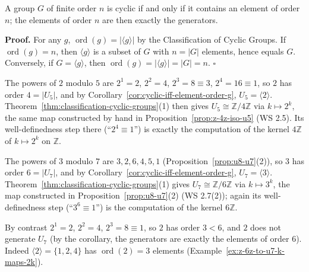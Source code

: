 \documentclass[11pt]{report}
\renewenvironment{proof}[1][Proof]{\noindent\textbf{#1.} }{\hfill$\square$\par\vspace{5pt}}
\begin{document}
\begin{corbox}\label{cor:cyclic-iff-element-order-g}
A group $G$ of finite order $n$ is cyclic if and only if it contains an element of order $n$; the elements of order $n$ are then exactly the generators.
\end{corbox}

\begin{proof}
For any $g$, $\operatorname{ord}(g) = |\langle g \rangle|$ by the Classification of Cyclic Groups. If $\operatorname{ord}(g) = n$, then $\langle g \rangle$ is a subset of $G$ with $n = |G|$ elements, hence equals $G$. Conversely, if $G = \langle g \rangle$, then $\operatorname{ord}(g) = |\langle g \rangle| = |G| = n$.
\end{proof}

\begin{exbox}\label{ex:u5-cyclic-instance-classification}
The powers of $2$ modulo $5$ are $2^1 = 2$, $2^2 = 4$, $2^3 = 8 \equiv 3$, $2^4 = 16 \equiv 1$, so $2$ has order $4 = |U_5|$, and by Corollary~\ref{cor:cyclic-iff-element-order-g}, $U_5 = \langle 2 \rangle$. Theorem~\ref{thm:classification-cyclic-groups}(1) then gives $U_5 \cong \mathbb{Z}/4\mathbb{Z}$ via $k \mapsto 2^k$, the same map constructed by hand in Proposition~\ref{prop:z-4z-iso-u5} (WS 2.5). Its well-definedness step there (``$2^4 \equiv 1$'') is exactly the computation of the kernel $4\mathbb{Z}$ of $k \mapsto 2^k$ on $\mathbb{Z}$.
\end{exbox}

\begin{exbox}\label{ex:u7-cyclic-generated-by-3}
The powers of $3$ modulo $7$ are $3, 2, 6, 4, 5, 1$ (Proposition~\ref{prop:u8-u7}(2)), so $3$ has order $6 = |U_7|$, and by Corollary~\ref{cor:cyclic-iff-element-order-g}, $U_7 = \langle 3 \rangle$. Theorem~\ref{thm:classification-cyclic-groups}(1) gives $U_7 \cong \mathbb{Z}/6\mathbb{Z}$ via $k \mapsto 3^k$, the map constructed in Proposition~\ref{prop:u8-u7}(2) (WS 2.7(2)); again its well-definedness step (``$3^6 \equiv 1$'') is the computation of the kernel $6\mathbb{Z}$.

By contrast $2^1 = 2$, $2^2 = 4$, $2^3 = 8 \equiv 1$, so $2$ has order $3 < 6$, and $2$ does not generate $U_7$ (by the corollary, the generators are exactly the elements of order $6$). Indeed $\langle 2 \rangle = \{1, 2, 4\}$ has $\operatorname{ord}(2) = 3$ elements (Example~\ref{ex:z-6z-to-u7-k-maps-2k}).
\end{exbox}
\end{document}
